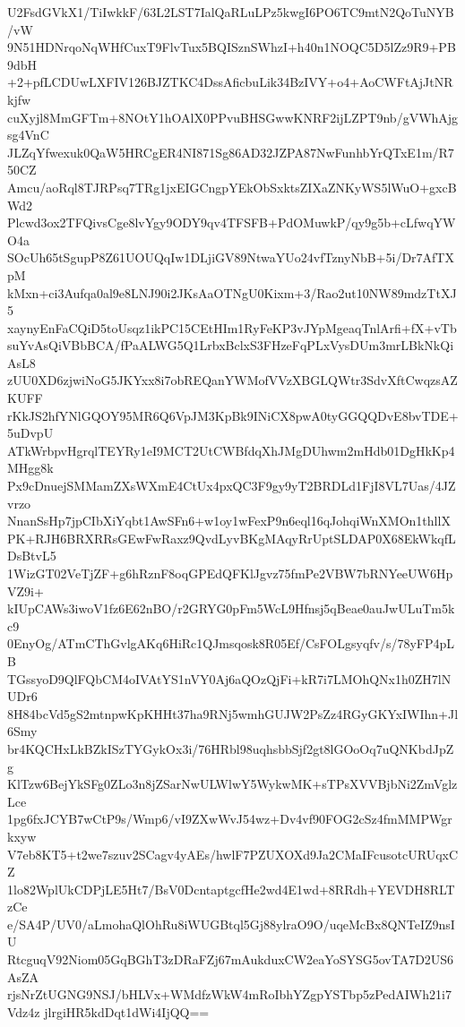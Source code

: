 U2FsdGVkX1/TiIwkkF/63L2LST7IalQaRLuLPz5kwgI6PO6TC9mtN2QoTuNYB/vW
9N51HDNrqoNqWHfCuxT9FlvTux5BQISznSWhzI+h40n1NOQC5D5lZz9R9+PB9dbH
+2+pfLCDUwLXFIV126BJZTKC4DssAficbuLik34BzIVY+o4+AoCWFtAjJtNRkjfw
cuXyjl8MmGFTm+8NOtY1hOAlX0PPvuBHSGwwKNRF2ijLZPT9nb/gVWhAjgsg4VnC
JLZqYfwexuk0QaW5HRCgER4NI871Sg86AD32JZPA87NwFunhbYrQTxE1m/R750CZ
Amcu/aoRql8TJRPsq7TRg1jxEIGCngpYEkObSxktsZIXaZNKyWS5lWuO+gxcBWd2
Plcwd3ox2TFQivsCge8lvYgy9ODY9qv4TFSFB+PdOMuwkP/qy9g5b+cLfwqYWO4a
SOcUh65tSgupP8Z61UOUQqIw1DLjiGV89NtwaYUo24vfTznyNbB+5i/Dr7AfTXpM
kMxn+ci3Aufqa0al9e8LNJ90i2JKsAaOTNgU0Kixm+3/Rao2ut10NW89mdzTtXJ5
xaynyEnFaCQiD5toUsqz1ikPC15CEtHIm1RyFeKP3vJYpMgeaqTnlArfi+fX+vTb
suYvAsQiVBbBCA/fPaALWG5Q1LrbxBclxS3FHzeFqPLxVysDUm3mrLBkNkQiAsL8
zUU0XD6zjwiNoG5JKYxx8i7obREQanYWMofVVzXBGLQWtr3SdvXftCwqzsAZKUFF
rKkJS2hfYNlGQOY95MR6Q6VpJM3KpBk9INiCX8pwA0tyGGQQDvE8bvTDE+5uDvpU
ATkWrbpvHgrqlTEYRy1eI9MCT2UtCWBfdqXhJMgDUhwm2mHdb01DgHkKp4MHgg8k
Px9cDnuejSMMamZXsWXmE4CtUx4pxQC3F9gy9yT2BRDLd1FjI8VL7Uas/4JZvrzo
NnanSsHp7jpCIbXiYqbt1AwSFn6+w1oy1wFexP9n6eql16qJohqiWnXMOn1thllX
PK+RJH6BRXRRsGEwFwRaxz9QvdLyvBKgMAqyRrUptSLDAP0X68EkWkqfLDsBtvL5
1WizGT02VeTjZF+g6hRznF8oqGPEdQFKlJgvz75fmPe2VBW7bRNYeeUW6HpVZ9i+
kIUpCAWs3iwoV1fz6E62nBO/r2GRYG0pFm5WcL9Hfnsj5qBeae0auJwULuTm5kc9
0EnyOg/ATmCThGvlgAKq6HiRc1QJmsqosk8R05Ef/CsFOLgsyqfv/s/78yFP4pLB
TGssyoD9QlFQbCM4oIVAtYS1nVY0Aj6aQOzQjFi+kR7i7LMOhQNx1h0ZH7lNUDr6
8H84bcVd5gS2mtnpwKpKHHt37ha9RNj5wmhGUJW2PsZz4RGyGKYxIWIhn+Jl6Smy
br4KQCHxLkBZkISzTYGykOx3i/76HRbl98uqhsbbSjf2gt8lGOoOq7uQNKbdJpZg
KlTzw6BejYkSFg0ZLo3n8jZSarNwULWlwY5WykwMK+sTPsXVVBjbNi2ZmVglzLce
1pg6fxJCYB7wCtP9s/Wmp6/vI9ZXwWvJ54wz+Dv4vf90FOG2cSz4fmMMPWgrkxyw
V7eb8KT5+t2we7szuv2SCagv4yAEs/hwlF7PZUXOXd9Ja2CMaIFcusotcURUqxCZ
1lo82WplUkCDPjLE5Ht7/BsV0DcntaptgcfHe2wd4E1wd+8RRdh+YEVDH8RLTzCe
e/SA4P/UV0/aLmohaQlOhRu8iWUGBtql5Gj88ylraO9O/uqeMcBx8QNTeIZ9nsIU
RtcguqV92Niom05GqBGhT3zDRaFZj67mAukduxCW2eaYoSYSG5ovTA7D2US6AsZA
rjsNrZtUGNG9NSJ/bHLVx+WMdfzWkW4mRoIbhYZgpYSTbp5zPedAIWh21i7Vdz4z
jlrgiHR5kdDqt1dWi4IjQQ==
